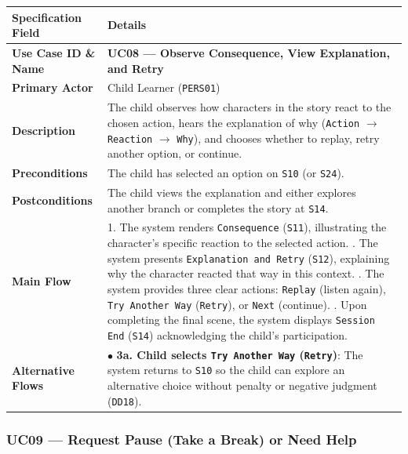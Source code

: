 \noindent\begin{xltabular}{\textwidth}{|p{4.0cm}|X|}
\hline
\textbf{Specification Field} & \textbf{Details} \\ \hline
\endhead
\textbf{Use Case ID \& Name} & \textbf{UC08 — Observe Consequence, View Explanation, and Retry} \\ \hline
\textbf{Primary Actor} & Child Learner (\texttt{PERS01}) \\ \hline
\textbf{Description} & The child observes how characters in the story react to the chosen action, hears the explanation of why (\texttt{Action} $\rightarrow$ \texttt{Reaction} $\rightarrow$ \texttt{Why}), and chooses whether to replay, retry another option, or continue. \\ \hline
\textbf{Preconditions} & The child has selected an option on \texttt{S10} (or \texttt{S24}). \\ \hline
\textbf{Postconditions} & The child views the explanation and either explores another branch or completes the story at \texttt{S14}. \\ \hline
\textbf{Main Flow} & 1. The system renders \texttt{Consequence} (\texttt{S11}), illustrating the character's specific reaction to the selected action. . The system presents \texttt{Explanation and Retry} (\texttt{S12}), explaining why the character reacted that way in this context. . The system provides three clear actions: \texttt{Replay} (listen again), \texttt{Try Another Way} (\texttt{Retry}), or \texttt{Next} (continue). . Upon completing the final scene, the system displays \texttt{Session End} (\texttt{S14}) acknowledging the child's participation. \\ \hline
\textbf{Alternative Flows} & $\bullet$ \textbf{3a. Child selects \texttt{Try Another Way} (\texttt{Retry})}: The system returns to \texttt{S10} so the child can explore an alternative choice without penalty or negative judgment (\texttt{DD18}). \\ \hline
\end{xltabular}



\subsubsection{UC09 — Request Pause (Take a Break) or Need Help}


